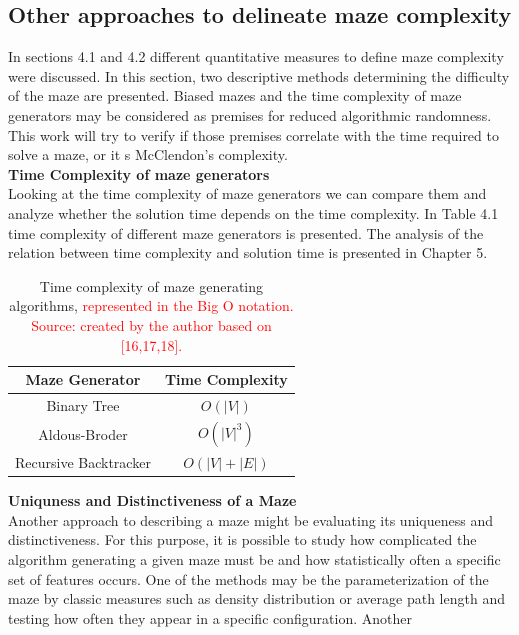 \subsection{Other approaches to delineate maze complexity }
In sections 4.1 and 4.2 different quantitative measures to define maze complexity were discussed. In this section, two descriptive methods determining the difficulty of the maze are presented. Biased mazes and the time complexity of maze generators may be considered as premises for reduced algorithmic randomness. This work will try to verify if those premises correlate with the time required to solve a maze, or it s McClendon’s complexity.\\ \newline
\textbf{Time Complexity of maze generators}\\
Looking at the time complexity of maze generators we can compare them and analyze whether the solution time depends on the time complexity. In Table 4.1 time complexity of different maze generators is presented. The analysis of the relation between time complexity and solution time is presented in Chapter 5.\\
\begin{table}[!ht]
\centering
\begin{tabular}{ |c||c| } 
\hline 
Maze Generator& Time Complexity\\ \hline
Binary Tree\cite{16} & $O(|V|)$\\
Aldous-Broder\cite{17}& $O(|V|^3)$\\ 
Recursive Backtracker\cite{18}& $O(|V|+|E|)$\\ 
\hline
 \end{tabular} 
\caption{Time complexity of maze generating algorithms, \textcolor{red}{represented in the Big O notation.\\Source: created by the author based on [16,17,18].}} 
 \end{table}
 \newline
 \newline
\textbf{Uniquness and Distinctiveness of a Maze}\\
Another approach to describing a maze might be evaluating its uniqueness and distinctiveness. For this purpose, it is possible to study how complicated the
algorithm generating a given maze must be and how statistically often a specific set of features occurs. One of the methods may be the parameterization of
the maze by classic measures such as density distribution or average path length and testing how often they appear in a specific configuration. Another
